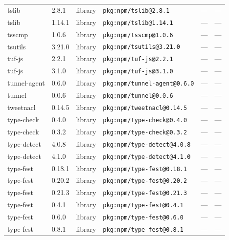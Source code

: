 \documentclass[11pt,a4paper]{article}
\begin{document}
\begin{longtable}{|p{4cm}|p{2cm}|p{1.6cm}|p{5cm}|p{1.5cm}|p{3.5cm}|}
\raggedright tslib & 2.8.1 & library & \small\texttt{pkg:npm/tslib@2.8.1} & — & \small — \\
\raggedright tslib & 1.14.1 & library & \small\texttt{pkg:npm/tslib@1.14.1} & — & \small — \\
\raggedright tsscmp & 1.0.6 & library & \small\texttt{pkg:npm/tsscmp@1.0.6} & — & \small — \\
\raggedright tsutils & 3.21.0 & library & \small\texttt{pkg:npm/tsutils@3.21.0} & — & \small — \\
\raggedright tuf-js & 2.2.1 & library & \small\texttt{pkg:npm/tuf-js@2.2.1} & — & \small — \\
\raggedright tuf-js & 3.1.0 & library & \small\texttt{pkg:npm/tuf-js@3.1.0} & — & \small — \\
\raggedright tunnel-agent & 0.6.0 & library & \small\texttt{pkg:npm/tunnel-agent@0.6.0} & — & \small — \\
\raggedright tunnel & 0.0.6 & library & \small\texttt{pkg:npm/tunnel@0.0.6} & — & \small — \\
\raggedright tweetnacl & 0.14.5 & library & \small\texttt{pkg:npm/tweetnacl@0.14.5} & — & \small — \\
\raggedright type-check & 0.4.0 & library & \small\texttt{pkg:npm/type-check@0.4.0} & — & \small — \\
\raggedright type-check & 0.3.2 & library & \small\texttt{pkg:npm/type-check@0.3.2} & — & \small — \\
\raggedright type-detect & 4.0.8 & library & \small\texttt{pkg:npm/type-detect@4.0.8} & — & \small — \\
\raggedright type-detect & 4.1.0 & library & \small\texttt{pkg:npm/type-detect@4.1.0} & — & \small — \\
\raggedright type-fest & 0.18.1 & library & \small\texttt{pkg:npm/type-fest@0.18.1} & — & \small — \\
\raggedright type-fest & 0.20.2 & library & \small\texttt{pkg:npm/type-fest@0.20.2} & — & \small — \\
\raggedright type-fest & 0.21.3 & library & \small\texttt{pkg:npm/type-fest@0.21.3} & — & \small — \\
\raggedright type-fest & 0.4.1 & library & \small\texttt{pkg:npm/type-fest@0.4.1} & — & \small — \\
\raggedright type-fest & 0.6.0 & library & \small\texttt{pkg:npm/type-fest@0.6.0} & — & \small — \\
\raggedright type-fest & 0.8.1 & library & \small\texttt{pkg:npm/type-fest@0.8.1} & — & \small — \\

\end{longtable}
\end{document}
